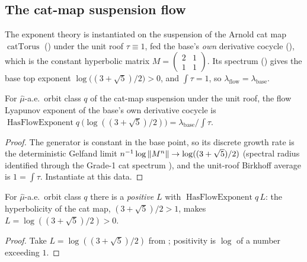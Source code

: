 \subsection{The cat-map suspension flow}

The exponent theory is instantiated on the suspension of the Arnold cat map $\operatorname{catTorus}$
() under the unit roof $\tau \equiv 1$, fed the base's \emph{own} derivative cocycle
(), which is the constant hyperbolic matrix
$M = \left(\begin{smallmatrix} 2 & 1 \\ 1 & 1 \end{smallmatrix}\right)$.
Its spectrum () gives the base top exponent
$\log\bigl((3+\sqrt5)/2\bigr) > 0$, and $\int\tau = 1$, so $\lambda_{\mathrm{flow}} = \lambda_{\mathrm{base}}$.

\begin{theorem}\label{thm:susp-catHasFlow}
  \leanok
  For $\hat\mu$-a.e.\ orbit class $q$ of the cat-map suspension under the unit roof, the flow
  Lyapunov exponent of the base's own derivative cocycle is
  $\operatorname{HasFlowExponent} q\ \bigl(\log((3+\sqrt5)/2)\bigr) = \lambda_{\mathrm{base}}/\int\tau$.
\end{theorem}
\begin{proof}\leanok
  The generator is constant in the base point, so its discrete growth rate is the deterministic
  Gelfand limit $n^{-1}\log\left\lVert M^n \right\rVert \to \log((3+\sqrt5)/2)$ (spectral radius identified through
  the Grade-1 cat spectrum ), and the unit-roof Birkhoff
  average is $1 = \int\tau$. Instantiate  at this data.
\end{proof}

\begin{theorem}\label{thm:susp-catPos}
  \leanok
  For $\hat\mu$-a.e.\ orbit class $q$ there is a \emph{positive} $L$ with
  $\operatorname{HasFlowExponent} q\,L$: the hyperbolicity of the cat map, $(3+\sqrt5)/2 > 1$,
  makes $L = \log((3+\sqrt5)/2) > 0$.
\end{theorem}
\begin{proof}\leanok
  Take $L = \log((3+\sqrt5)/2)$ from ; positivity is
  $\log$ of a number exceeding $1$.
\end{proof}

